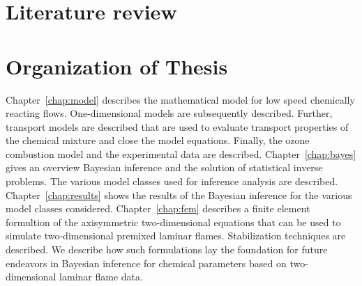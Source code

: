 \section{Literature review}



\section{Organization of Thesis}
\bigskip

Chapter~\ref{chap:model} describes the mathematical model for low speed
chemically reacting flows. One-dimensional models are subsequently described.
Further, transport models are described that are used to evaluate
transport properties of the chemical mixture and close the model equations.
Finally, the ozone combustion model and the experimental data are
described.
Chapter~\ref{chap:bayes} gives an overview
Bayesian inference and the solution of statistical inverse problems.
The various model classes used for inference
analysis are described.
Chapter~\ref{chap:results} shows the results of the Bayesian inference
for the various model classes considered.
Chapter~\ref{chap:fem} describes a finite element formultion of the
axisymmetric two-dimensional equations that can be used to simulate
two-dimensional premixed laminar flames. Stabilization techniques are
described. We describe how such formulations lay the foundation for future
endeavors in Bayesian inference for chemical parameters based on
two-dimensional laminar flame data.
